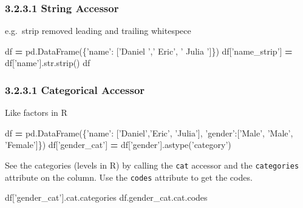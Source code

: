 \documentclass[]{book}
\newenvironment{Shaded}{\begin{snugshade}}{\end{snugshade}}
\newcommand{\BuiltInTok}[1]{#1}
\newcommand{\NormalTok}[1]{#1}
\newcommand{\OperatorTok}[1]{\textcolor[rgb]{0.81,0.36,0.00}{\textbf{#1}}}
\newcommand{\StringTok}[1]{\textcolor[rgb]{0.31,0.60,0.02}{#1}}
\theoremstyle{definition}
\theoremstyle{definition}
\theoremstyle{definition}
\theoremstyle{remark}
\begin{document}
\hypertarget{string-accessor}{%
\subsubsection{3.2.3.1 String Accessor}\label{string-accessor}}

e.g.~strip removed leading and trailing whitespece

\begin{Shaded}
\begin{Highlighting}[]
\NormalTok{df }\OperatorTok{=}\NormalTok{ pd.DataFrame(\{}\StringTok{'name'}\NormalTok{: [}\StringTok{'Daniel  '}\NormalTok{,}\StringTok{'  Eric'}\NormalTok{, }\StringTok{'  Julia  '}\NormalTok{]\})}
\NormalTok{df[}\StringTok{'name_strip'}\NormalTok{] }\OperatorTok{=}\NormalTok{ df[}\StringTok{'name'}\NormalTok{].}\BuiltInTok{str}\NormalTok{.strip()}
\NormalTok{df}
\end{Highlighting}
\end{Shaded}

\hypertarget{categorical-accessor}{%
\subsubsection{3.2.3.1 Categorical
Accessor}\label{categorical-accessor}}

Like factors in R

\begin{Shaded}
\begin{Highlighting}[]
\NormalTok{df }\OperatorTok{=}\NormalTok{ pd.DataFrame(\{}\StringTok{'name'}\NormalTok{: [}\StringTok{'Daniel'}\NormalTok{,}\StringTok{'Eric'}\NormalTok{, }\StringTok{'Julia'}\NormalTok{],}
                   \StringTok{'gender'}\NormalTok{:[}\StringTok{'Male'}\NormalTok{, }\StringTok{'Male'}\NormalTok{, }\StringTok{'Female'}\NormalTok{]\})}
\NormalTok{df[}\StringTok{'gender_cat'}\NormalTok{] }\OperatorTok{=}\NormalTok{ df[}\StringTok{'gender'}\NormalTok{].astype(}\StringTok{'category'}\NormalTok{) }
\end{Highlighting}
\end{Shaded}

See the categories (levels in R) by calling the \texttt{cat} accessor
and the \texttt{categories} attribute on the column. Use the
\texttt{codes} attribute to get the codes.

\begin{Shaded}
\begin{Highlighting}[]
\NormalTok{df[}\StringTok{'gender_cat'}\NormalTok{].cat.categories}
\NormalTok{df.gender_cat.cat.codes}
\end{Highlighting}
\end{Shaded}
\end{document}
